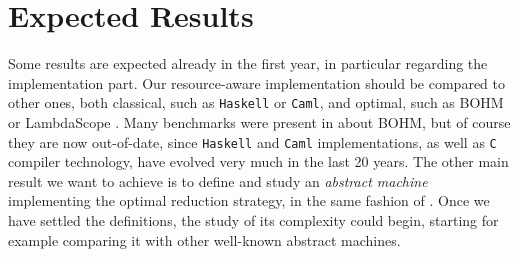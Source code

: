 \documentclass[english]{scrartcl}
\begin{document}
\section{Expected Results}
Some results are expected already in the first year, in particular regarding the implementation part. Our resource-aware implementation should be compared to other ones, both classical, such as \texttt{Haskell} or \texttt{Caml}, and optimal, such as BOHM \cite{asperti_bologna_1996} or LambdaScope \cite{van_oostrom_lambdascope._2010}. Many benchmarks were present in \cite{asperti_optimal_1998} about BOHM, but of course they are now out-of-date, since \texttt{Haskell} and \texttt{Caml} implementations, as well as \texttt{C} compiler technology, have evolved very much in the last 20 years. The other main result we want to achieve is to define and study an \emph{abstract machine} implementing the optimal reduction strategy, in the same fashion of \cite{danos_reversible_1999}. Once we have settled the definitions, the study of its complexity could begin, starting for example comparing it with other well-known abstract machines.


\end{document}
